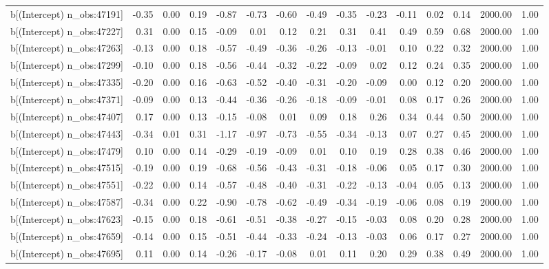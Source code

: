 \begin{table}[ht]
\begin{tabular}{rrrrrrrrrrrrrrr}
  b[(Intercept) n\_obs:47191] & -0.35 & 0.00 & 0.19 & -0.87 & -0.73 & -0.60 & -0.49 & -0.35 & -0.23 & -0.11 & 0.02 & 0.14 & 2000.00 & 1.00 \\ 
  b[(Intercept) n\_obs:47227] & 0.31 & 0.00 & 0.15 & -0.09 & 0.01 & 0.12 & 0.21 & 0.31 & 0.41 & 0.49 & 0.59 & 0.68 & 2000.00 & 1.00 \\ 
  b[(Intercept) n\_obs:47263] & -0.13 & 0.00 & 0.18 & -0.57 & -0.49 & -0.36 & -0.26 & -0.13 & -0.01 & 0.10 & 0.22 & 0.32 & 2000.00 & 1.00 \\ 
  b[(Intercept) n\_obs:47299] & -0.10 & 0.00 & 0.18 & -0.56 & -0.44 & -0.32 & -0.22 & -0.09 & 0.02 & 0.12 & 0.24 & 0.35 & 2000.00 & 1.00 \\ 
  b[(Intercept) n\_obs:47335] & -0.20 & 0.00 & 0.16 & -0.63 & -0.52 & -0.40 & -0.31 & -0.20 & -0.09 & 0.00 & 0.12 & 0.20 & 2000.00 & 1.00 \\ 
  b[(Intercept) n\_obs:47371] & -0.09 & 0.00 & 0.13 & -0.44 & -0.36 & -0.26 & -0.18 & -0.09 & -0.01 & 0.08 & 0.17 & 0.26 & 2000.00 & 1.00 \\ 
  b[(Intercept) n\_obs:47407] & 0.17 & 0.00 & 0.13 & -0.15 & -0.08 & 0.01 & 0.09 & 0.18 & 0.26 & 0.34 & 0.44 & 0.50 & 2000.00 & 1.00 \\ 
  b[(Intercept) n\_obs:47443] & -0.34 & 0.01 & 0.31 & -1.17 & -0.97 & -0.73 & -0.55 & -0.34 & -0.13 & 0.07 & 0.27 & 0.45 & 2000.00 & 1.00 \\ 
  b[(Intercept) n\_obs:47479] & 0.10 & 0.00 & 0.14 & -0.29 & -0.19 & -0.09 & 0.01 & 0.10 & 0.19 & 0.28 & 0.38 & 0.46 & 2000.00 & 1.00 \\ 
  b[(Intercept) n\_obs:47515] & -0.19 & 0.00 & 0.19 & -0.68 & -0.56 & -0.43 & -0.31 & -0.18 & -0.06 & 0.05 & 0.17 & 0.30 & 2000.00 & 1.00 \\ 
  b[(Intercept) n\_obs:47551] & -0.22 & 0.00 & 0.14 & -0.57 & -0.48 & -0.40 & -0.31 & -0.22 & -0.13 & -0.04 & 0.05 & 0.13 & 2000.00 & 1.00 \\ 
  b[(Intercept) n\_obs:47587] & -0.34 & 0.00 & 0.22 & -0.90 & -0.78 & -0.62 & -0.49 & -0.34 & -0.19 & -0.06 & 0.08 & 0.19 & 2000.00 & 1.00 \\ 
  b[(Intercept) n\_obs:47623] & -0.15 & 0.00 & 0.18 & -0.61 & -0.51 & -0.38 & -0.27 & -0.15 & -0.03 & 0.08 & 0.20 & 0.28 & 2000.00 & 1.00 \\ 
  b[(Intercept) n\_obs:47659] & -0.14 & 0.00 & 0.15 & -0.51 & -0.44 & -0.33 & -0.24 & -0.13 & -0.03 & 0.06 & 0.17 & 0.27 & 2000.00 & 1.00 \\ 
  b[(Intercept) n\_obs:47695] & 0.11 & 0.00 & 0.14 & -0.26 & -0.17 & -0.08 & 0.01 & 0.11 & 0.20 & 0.29 & 0.38 & 0.49 & 2000.00 & 1.00 \\ 

\end{tabular}
\end{table}
